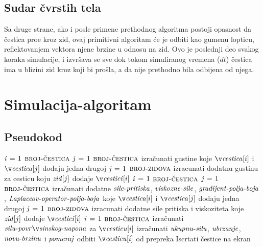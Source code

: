 \documentclass[12pt]{article}
\begin{document}
    \subsection{Sudar \v cvrstih tela} \label{Sudar cvrstih tela}
        Sa druge strane, ako i posle primene prethodnog algoritma postoji opasnost da \v cestica pro\dj e kroz zid, ovaj primitivni algoritam \'ce je odbiti kao gumenu lopticu, reflektovanjem vektora njene brzine u odnosu na zid. Ovo je poslednji deo svakog koraka simulacije, i izvr\v sava se sve dok tokom simuliranog vremena ($dt$) \v cestica ima u blizini zid kroz koji bi pro\v sla, a da nije prethodno bila odbijena od njega.

\section{Simulacija-algoritam}
    \subsection{Pseudokod}

\begin{codebox}
\li \While {} \Do
\li     \For $\id{i} \gets 1$ \To $\const{broj-\v cestica}$ \Do
\li         \For $\id{j} \gets 1$ \To $\const{broj-\v cestica}$ \Do
\li             izra\v cunati gustine koje $\id{\v cestica}[i]$ i $\id{\v cestica}[j]$ dodaju jedna drugoj
            \End
\li         \For $\id{j} \gets 1$ \To $\textnormal{\scshape broj-zidova}$ \Do
\li             izracunati dodatnu gustinu za cesticu koju $\id{zid}[j]$ dodaje $\id{\v cestici}[i]$
            \End
        \End
\li     \For $\id{i} \gets 1$ \To $\const{broj-\v cestica}$ \Do
\li         \For $\id{j} \gets 1$ \To $\const{broj-\v cestica}$ \Do
\li             izra\v cunati dodatne $\id{sile-pritiska}$, $\id{viskozne-sile}$, 
\zi             $\id{gradijent-polja-boja}$, $\id{Laplaceov-operator-polja-boja}$ 
\zi             koje $\id{\v cestica}[i]$ i $\id{\v cestica}[j]$ dodaju jedna drugoj
            \End
\li         \For $\id{j} \gets 1$ \To $\textnormal{\scshape broj-zidova}$ \Do
\li             izracunati dodatne sile pritiska i viskoziteta
\zi             koje $\id{zid}[j]$ dodaje $\id{\v cestici}[i]$
            \End
        \End
\li     \For $\id{i} \gets 1$ \To $\const{broj-\v cestica}$ \Do
\li          izra\v cunati $\id{silu-povr\v sinskog-napona}$ za $\id{\v cesticu}[i]$
\li          izra\v cunati $\id{ukupnu-silu}$, $\id{ubrzanje}$, $\id{novu-brzinu}$ i $\id{pomeraj}$
\li          odbiti $\id{\v cesticu}[i]$ od prepreka
        \End
\li     Iscrtati \v cestice na ekran  
   \End 
\end{codebox}
\end{document}
